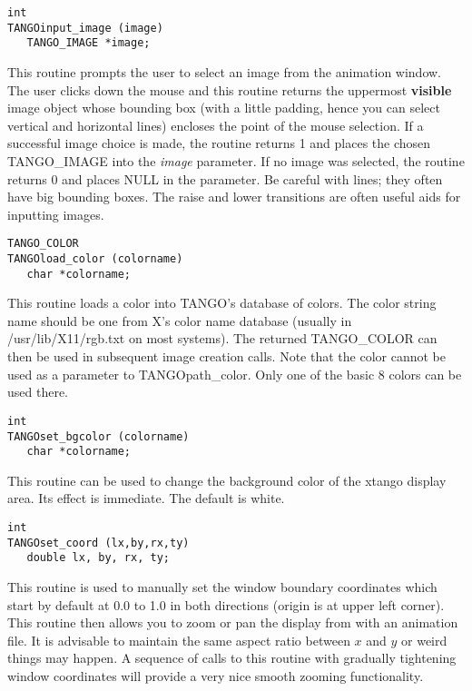 \vspace{1em}
\begin{verbatim}
int
TANGOinput_image (image) 
   TANGO_IMAGE *image;
\end{verbatim}
This routine prompts the user to select an image from the animation
window.  The user clicks down the mouse and this routine returns the
uppermost {\bf visible} image object whose bounding box (with a little
padding, hence you can select vertical and horizontal lines) encloses
the point of the mouse selection. If a successful image choice is
made, the routine returns 1 and places the chosen TANGO\_IMAGE into
the {\em image} parameter.  If no image was selected, the routine
returns 0 and places NULL in the parameter.  Be careful with lines;
they often have big bounding boxes.  The raise and lower transitions
are often useful aids for inputting images.

\vspace{1em}
\begin{verbatim}
TANGO_COLOR
TANGOload_color (colorname)
   char *colorname;
\end{verbatim}
This routine loads a color into TANGO's database of colors.  The color
string name should be one from X's color name database (usually in
/usr/lib/X11/rgb.txt on most systems).  The returned TANGO\_COLOR can
then be used in subsequent image creation calls.  Note that the color
cannot be used as a parameter to TANGOpath\_color.  Only one of the
basic 8 colors can be used there.

\vspace{1em}
\begin{verbatim}
int
TANGOset_bgcolor (colorname) 
   char *colorname;
\end{verbatim}
This routine can be used to change the background color of the xtango
display area.  Its effect is immediate.  The default is white.

\vspace{1em}
\begin{verbatim}
int
TANGOset_coord (lx,by,rx,ty) 
   double lx, by, rx, ty;
\end{verbatim}
This routine is used to manually set the window boundary coordinates
which start by default at 0.0 to 1.0 in both directions (origin is at
upper left corner).  This routine then allows you to zoom or pan the
display from with an animation file.  It is advisable to maintain the
same aspect ratio between $x$ and $y$ or weird things may happen.  A
sequence of calls to this routine with gradually tightening window
coordinates will provide a very nice smooth zooming functionality.

